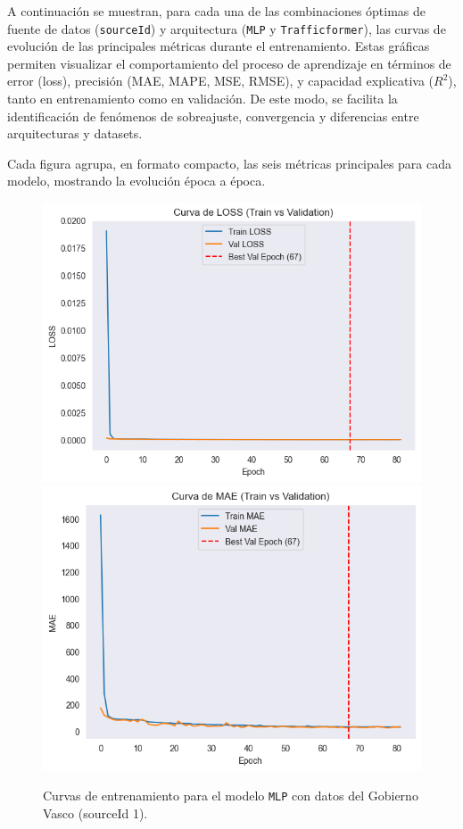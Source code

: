 
A continuación se muestran, para cada una de las combinaciones óptimas de fuente de datos (\texttt{sourceId}) y arquitectura (\texttt{MLP} y \texttt{Trafficformer}), las curvas de evolución de las principales métricas durante el entrenamiento. Estas gráficas permiten visualizar el comportamiento del proceso de aprendizaje en términos de error (loss), precisión (MAE, MAPE, MSE, RMSE), y capacidad explicativa ($R^2$), tanto en entrenamiento como en validación. De este modo, se facilita la identificación de fenómenos de sobreajuste, convergencia y diferencias entre arquitecturas y datasets.

Cada figura agrupa, en formato compacto, las seis métricas principales para cada modelo, mostrando la evolución época a época.

\begin{figure}[H]
	\centering
	\caption{Curvas de entrenamiento para el modelo \texttt{MLP} con datos del Gobierno Vasco (sourceId 1).}
	\begin{minipage}{0.48\textwidth}
		\centering
		\includegraphics[width=\linewidth]{includes/cap5/graphs/sid1_mlp_loss.png}
		\vspace{0.2cm}
		\includegraphics[width=\linewidth]{includes/cap5/graphs/sid1_mlp_mae.png}

\end{minipage}
\end{figure}
